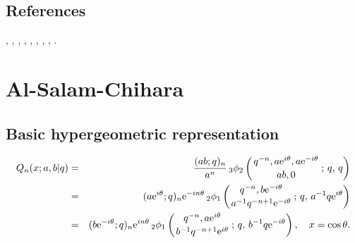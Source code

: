 \documentclass[envcountchap,graybox]{svmono}
\newcommand{\qhyp}[5]{\mbox{}_{#1}{\phi}_{#2}
\left(\genfrac{}{}{0pt}{}{#3}{#4}\,;\,q,\,#5\right)}
\newcommand{\e}{\textrm{e}}
\begin{document}
\subsection*{References}
\cite{AlvarezSmirnov}, \cite{AndrewsAskey85}, \cite{AskeyWilson79},
\cite{AskeyWilson85}, \cite{AtakRahmanSuslov}, \cite{GasperRahman90},
\cite{KoelinkKoorn}, \cite{Nikiforov+}, \cite{Stanton84}.


\section{Al-Salam-Chihara}
\par\setcounter{equation}{0}

\subsection*{Basic hypergeometric representation}
\begin{eqnarray}
\label{DefAlSalamChihara}
Q_n(x;a,b|q)&=&\frac{(ab;q)_n}{a^n}\,
\qhyp{3}{2}{q^{-n},a\e^{i\theta},a\e^{-i\theta}}{ab,0}{q}\\
&=&(a\e^{i\theta};q)_n\e^{-in\theta}\,\qhyp{2}{1}{q^{-n},b\e^{-i\theta}}
{a^{-1}q^{-n+1}\e^{-i\theta}}{a^{-1}q\e^{i\theta}}\nonumber\\
&=&(b\e^{-i\theta};q)_n\e^{in\theta}\,\qhyp{2}{1}{q^{-n},a\e^{i\theta}}
{b^{-1}q^{-n+1}\e^{i\theta}}{b^{-1}q\e^{-i\theta}},\quad x=\cos\theta.\nonumber
\end{eqnarray}
\end{document}
